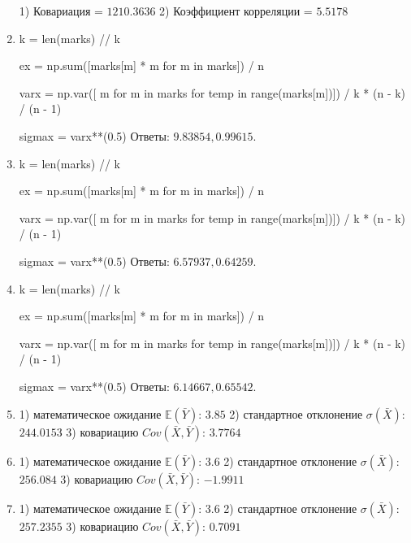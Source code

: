 \documentclass[a4paper,12pt]{article}
\begin{document}
\begin{enumerate}
1) Ковариация = $1210.3636$
2) Коэффициент корреляции = $5.5178$



\item

    


    k = len(marks) // k

    ex = np.sum([marks[m] * m for m in marks]) / n

    varx = np.var([ m for m in marks for temp in range(marks[m])]) / k * (n - k) / (n - 1)

    sigmax = varx**(0.5)
    Ответы: $9.83854, 0.99615$.

    


\item

    


    k = len(marks) // k

    ex = np.sum([marks[m] * m for m in marks]) / n

    varx = np.var([ m for m in marks for temp in range(marks[m])]) / k * (n - k) / (n - 1)

    sigmax = varx**(0.5)
    Ответы: $6.57937, 0.64259$.

    


\item

    


    k = len(marks) // k

    ex = np.sum([marks[m] * m for m in marks]) / n

    varx = np.var([ m for m in marks for temp in range(marks[m])]) / k * (n - k) / (n - 1)

    sigmax = varx**(0.5)
    Ответы: $6.14667, 0.65542$.

    


\item


1) математическое ожидание $\mathbb{E}(\bar Y)$: $3.85$ 
2) стандартное отклонение $\sigma(\bar X)$: $244.0153$
3) ковариацию $Cov(\bar X, \bar Y)$: $3.7764$



\item


1) математическое ожидание $\mathbb{E}(\bar Y)$: $3.6$ 
2) стандартное отклонение $\sigma(\bar X)$: $256.084$
3) ковариацию $Cov(\bar X, \bar Y)$: $-1.9911$



\item


1) математическое ожидание $\mathbb{E}(\bar Y)$: $3.6$ 
2) стандартное отклонение $\sigma(\bar X)$: $257.2355$
3) ковариацию $Cov(\bar X, \bar Y)$: $0.7091$




\end{enumerate}
\end{document}
